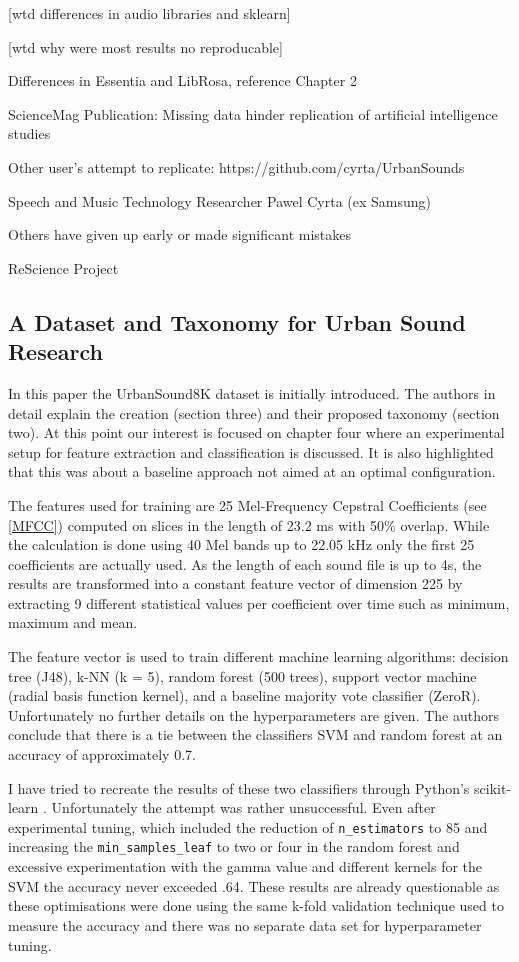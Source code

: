[wtd differences in audio libraries and sklearn]

[wtd why were most results no reproducable]

Differences in Essentia and LibRosa, reference Chapter 2



ScienceMag Publication: Missing data hinder replication of artificial intelligence studies

Other user's attempt to replicate: https://github.com/cyrta/UrbanSounds

Speech and Music Technology Researcher Pawel Cyrta (ex Samsung)

Others have given up early or made significant mistakes

ReScience Project


\subsection{A Dataset and Taxonomy for Urban Sound Research}

In this paper \cite{Salamon:UrbanSound:ACMMM:14} the UrbanSound8K dataset is initially introduced. The authors in detail explain the creation (section three) and their proposed taxonomy (section two). At this point  our interest is focused on chapter four where an experimental setup for feature extraction and classification is discussed. It is also highlighted that this was about a baseline approach not aimed at an optimal configuration.

The features used for training are 25 Mel-Frequency Cepstral Coefficients (see \ref{MFCC}) computed on slices in the length of 23.2 ms with 50\% overlap. While the calculation is done using 40 Mel bands up to 22.05 kHz only the first 25 coefficients are actually used. As the length of each sound file is up to 4s, the results are transformed into a constant feature vector of dimension 225 by extracting 9 different statistical values per coefficient over time such as minimum, maximum and mean.

The feature vector is used to train different machine learning algorithms: decision tree (J48), k-NN (k = 5), random forest (500 trees), support vector machine (radial basis function kernel), and a baseline majority vote classifier (ZeroR). Unfortunately no further details on the hyperparameters are given. The authors conclude that there is a tie between the classifiers SVM and random forest at an accuracy of approximately 0.7.

I have tried to recreate the results of these two classifiers through Python's scikit-learn \cite{scikit-learn}. Unfortunately the attempt was rather unsuccessful. Even after experimental tuning, which included the reduction of \texttt{n_estimators} to 85 and increasing the \texttt{min_samples_leaf} to two or four in the random forest and excessive experimentation with the gamma value and different kernels for the SVM the accuracy never exceeded .64. These results are already questionable as these optimisations were done using the same k-fold validation technique used to measure the accuracy and there was no separate data set for hyperparameter tuning.
 
